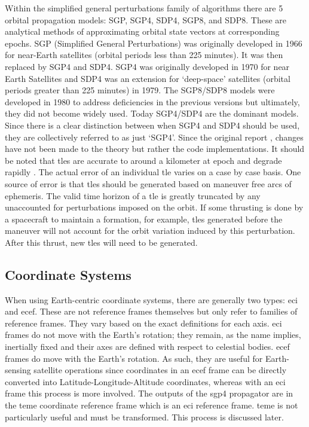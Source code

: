 Within the simplified general perturbations family of algorithms there are 5
orbital propagation models: SGP, SGP4, SDP4, SGP8, and SDP8. These are
analytical methods of approximating orbital state vectors at corresponding
epochs. SGP (Simplified General Perturbations) was originally developed in 1966
for near-Earth satellites (orbital periods less than 225 minutes). It was then
replaced by SGP4 and SDP4.  SGP4 was originally developed in 1970 for near
Earth Satellites and SDP4 was an extension for `deep-space' satellites (orbital
periods greater than 225 minutes) in 1979.  The SGP8/SDP8 models were developed
in 1980 to address deficiencies in the previous versions but ultimately, they
did not become widely used.  Today SGP4/SDP4 are the dominant models.  Since
there is a clear distinction between when SGP4 and SDP4 should be used, they
are collectively referred to as just `SGP4'. Since the original report
\cite{hoots_spacetrack_1980}, changes have not been made to the theory but
rather the code implementations.  It should be noted that \glspl{tle} are
accurate to around a kilometer at epoch and degrade rapidly
\cite{vallado_revisiting_2006}. The actual error of an individual \gls{tle}
varies on a case by case basis. One source of error is that \glspl{tle} should
be generated based on maneuver free arcs of ephemeris. The valid time horizon
of a \gls{tle} is greatly truncated by any unaccounted for perturbations
imposed on the orbit. If some thrusting is done by a spacecraft to maintain a
formation, for example, \glspl{tle} generated before the maneuver will not
account for the orbit variation induced by this perturbation. After this
thrust, new \glspl{tle} will need to be generated.




\subsection{Coordinate Systems}

When using Earth-centric coordinate systems, there are generally two types:
\gls{eci} and \gls{ecef}. These are not reference frames themselves but only
refer to families of reference frames. They vary based on the exact definitions
for each axis.  \gls{eci} frames do not move with the Earth's rotation; they
remain, as the name implies, inertially fixed and their axes are defined with
respect to celestial bodies. \gls{ecef} frames do move with the Earth's
rotation. As such, they are useful for Earth-sensing satellite operations since
coordinates in an \gls{ecef} frame can be directly converted into
Latitude-Longitude-Altitude coordinates, whereas with an \gls{eci} frame this
process is more involved. The outputs of the \gls{sgp4} propagator are in the
\gls{teme} coordinate reference frame which is an \gls{eci} reference frame.
\gls{teme} is not particularly useful and must be transformed.  This process is
discussed later.



